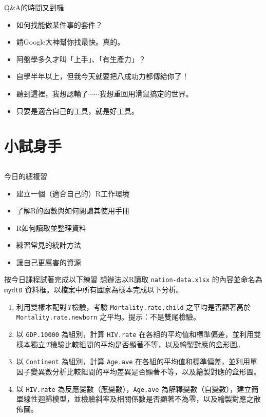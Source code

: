 \documentclass[12pt, aspectratio=43]{beamer}
\begin{document}
\begin{frame}[fragile]{Q\&A的時間又到囉}
\begin{itemize}
\item[Q] 如何找能做某件事的套件？
\item[A] 請Google大神幫你找最快。真的。
\end{itemize}
\begin{itemize}
\item[Q] 阿盤學多久才叫「上手」、「有生產力」？
\item[A] 自學半年以上，但我今天就要把八成功力都傳給你了！
\end{itemize}
\begin{itemize}\item[Q] 聽到這裡，我想認輸了$\cdots\cdots$我想重回用滑鼠搞定的世界。
\item[A] 只要是適合自己的工具，就是好工具。
\end{itemize}
\end{frame}

\section{小試身手}\subsection{}

\begin{frame}{今日的總複習}
\begin{itemize}
\item 建立一個（適合自己的）R工作環境
\item 了解R的函數與如何閱讀其使用手冊
\item R如何讀取並整理資料
\item 練習常見的統計方法
\item 讓自己更厲害的資源
\end{itemize}
\end{frame}


\begin{frame}[shrink=8, fragile]{按今日課程試著完成以下練習}
想辦法以R讀取 \verb+nation-data.xlsx+ 的內容並命名為 \verb+mydt0+ 資料框。以檔案中所有國家為樣本完成以下分析。
\begin{enumerate}
\item 利用雙樣本配對\emph{T}檢驗，考驗 \verb+Mortality.rate.child+ 之平均是否顯著高於 \verb+Mortality.rate.newborn+ 之平均。提示：不是雙尾檢驗。
\item 以 \verb+GDP.10000+ 為組別，計算 \verb+HIV.rate+ 在各組的平均值和標準偏差，並利用雙樣本獨立\emph{T}檢驗比較組間的平均是否顯著不等，以及繪製對應的盒形圖。
\item 以 \verb+Continent+ 為組別，計算 \verb+Age.ave+ 在各組的平均值和標準偏差，並利用單因子變異數分析比較組間的平均差異是否顯著不等，以及繪製對應的盒形圖。
\item 以 \verb+HIV.rate+ 為反應變數（應變數），\verb+Age.ave+ 為解釋變數（自變數），建立簡單線性迴歸模型，並檢驗斜率及相關係數是否顯著不為零，以及繪製對應之散佈圖。
\end{enumerate}
\end{frame}
\end{document}
